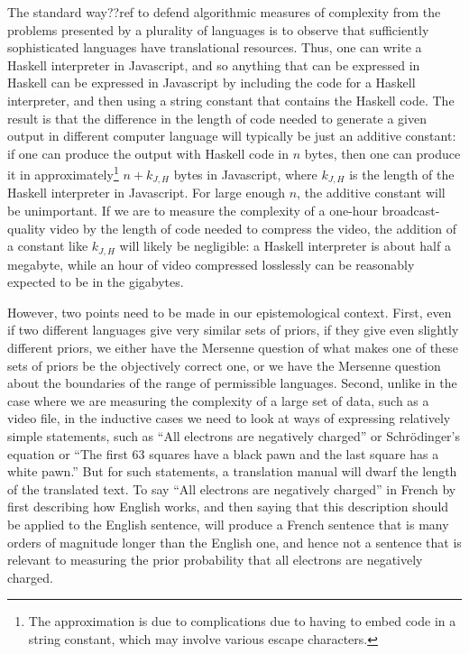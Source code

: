 The standard way??ref to defend algorithmic measures of complexity from the problems presented by a plurality of languages
is to observe that sufficiently sophisticated languages have translational resources. Thus, one can write a Haskell interpreter
in Javascript, and so anything that can be expressed in Haskell can be expressed in Javascript by including the code for a Haskell interpreter, 
and then using a string constant that contains the Haskell code. The result is that the difference in the length of code needed to
generate a given output in different computer language will typically be just an additive constant: if one can
produce the output with Haskell code in $n$ bytes, then one can produce it in approximately\footnote{The approximation is due
to complications due to having to embed code in a string constant, which may involve various escape characters.} $n+k_{J,H}$ 
bytes in Javascript, where $k_{J,H}$ is the length of the Haskell interpreter in Javascript. For large enough $n$, the additive constant will be
unimportant. If we are to measure the complexity of a one-hour broadcast-quality video by the length of code needed to compress 
the  video, the addition of a constant like $k_{J,H}$ will likely be negligible: a Haskell interpreter is about half a megabyte, while 
an hour of video compressed losslessly can be reasonably expected to be in the gigabytes.

However, two points need to be made in our epistemological context. First, even if two different languages give very similar sets of priors, 
if they give even slightly different priors, we either have the Mersenne question of what makes one of these sets of priors be the 
objectively correct one, or we have the Mersenne question about the boundaries of the range of permissible languages. Second,
unlike in the case where we are measuring the complexity of a large set of data, such as a video file, in the inductive cases we 
need to look at ways of expressing relatively simple statements, such as ``All electrons are negatively charged'' or 
Schr\"odinger's equation or ``The first 63 squares have a black pawn and the last square has a white pawn.'' But for such statements, 
a translation manual will dwarf the length of the translated text. To say ``All electrons are negatively charged'' in French by first describing how English works, and then saying that this
description should be applied to the English sentence, will produce a French sentence that is many orders of magnitude longer
than the English one, and hence not a sentence that is relevant to measuring the prior probability that all electrons are negatively
charged.

